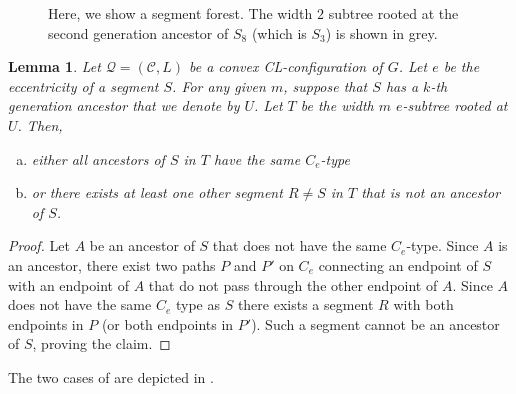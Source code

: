 \documentclass{article}
\newtheorem{lemma}[theorem]{Lemma}
\numberwithin{claimcounter}{lemma}
\begin{document}
\begin{figure}
{
}
    \caption{Here, we show a segment forest. The width $2$ subtree rooted at the second generation ancestor of $S_8$ (which is $S_3$) is shown in grey.}
    \label{fig:depth-m}
\end{figure}




\begin{lemma} \label{lem:eitheror}
Let $\mathcal{Q}=(\mathcal{C},L)$ be a  convex CL-configuration of $G$.
    Let $e$ be the eccentricity of a segment $S$. For any given $m$, suppose that $S$ has a $k$-th generation ancestor that we denote by $U$. Let $T$ be the width $m$ $e$-subtree rooted at $U$. Then, 
    \begin{enumerate}[a.]
        \item  either all ancestors of $S$ in $T$ have the same $C_e$-type
        \item or there exists at least one other segment $R \neq S$ in $T$ that is not an ancestor of $S$.
    \end{enumerate}
\end{lemma}
\begin{proof}
    Let $A$ be an ancestor of $S$ that does not have the same $C_e$-type. Since $A$ is an ancestor, there exist two paths $P$ and $P'$ on $C_e$ connecting an endpoint of $S$ with an endpoint of $A$ that do not pass through the other endpoint of $A$. Since $A$ does not have the same $C_e$ type as $S$ there exists a segment $R$ with both endpoints in $P$ (or both endpoints in $P'$). Such a segment cannot be an ancestor of $S$, proving the claim.
\end{proof}

The two cases of  are depicted in .
\end{document}
